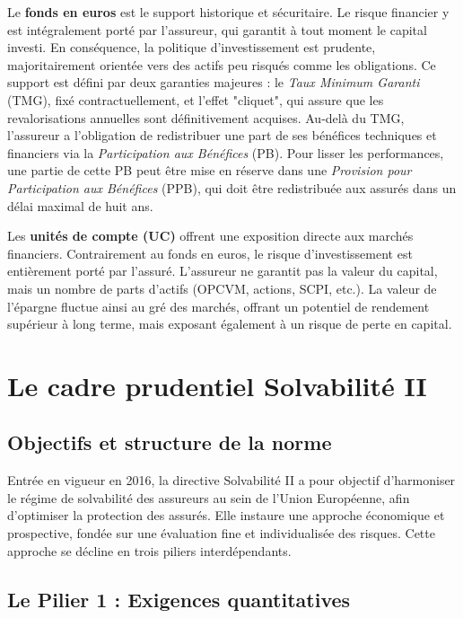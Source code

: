 Le \textbf{fonds en euros} est le support historique et sécuritaire. Le risque financier y est intégralement porté par l'assureur, qui garantit à tout moment le capital investi. En conséquence, la politique d'investissement est prudente, majoritairement orientée vers des actifs peu risqués comme les obligations. Ce support est défini par deux garanties majeures : le \textit{Taux Minimum Garanti} (TMG), fixé contractuellement, et l'effet "cliquet", qui assure que les revalorisations annuelles sont définitivement acquises. Au-delà du TMG, l'assureur a l'obligation de redistribuer une part de ses bénéfices techniques et financiers via la \textit{Participation aux Bénéfices} (PB). Pour lisser les performances, une partie de cette PB peut être mise en réserve dans une \textit{Provision pour Participation aux Bénéfices} (PPB), qui doit être redistribuée aux assurés dans un délai maximal de huit ans.

\bigskip

Les \textbf{unités de compte (UC)} offrent une exposition directe aux marchés financiers. Contrairement au fonds en euros, le risque d'investissement est entièrement porté par l'assuré. L'assureur ne garantit pas la valeur du capital, mais un nombre de parts d'actifs (OPCVM, actions, SCPI, etc.). La valeur de l'épargne fluctue ainsi au gré des marchés, offrant un potentiel de rendement supérieur à long terme, mais exposant également à un risque de perte en capital.

\section{Le cadre prudentiel Solvabilité II}
\label{sec:s2}

\subsection{Objectifs et structure de la norme}

Entrée en vigueur en 2016, la directive Solvabilité II a pour objectif d'harmoniser le régime de solvabilité des assureurs au sein de l'Union Européenne, afin d'optimiser la protection des assurés. Elle instaure une approche économique et prospective, fondée sur une évaluation fine et individualisée des risques. Cette approche se décline en trois piliers interdépendants.

\subsection{Le Pilier 1 : Exigences quantitatives}

